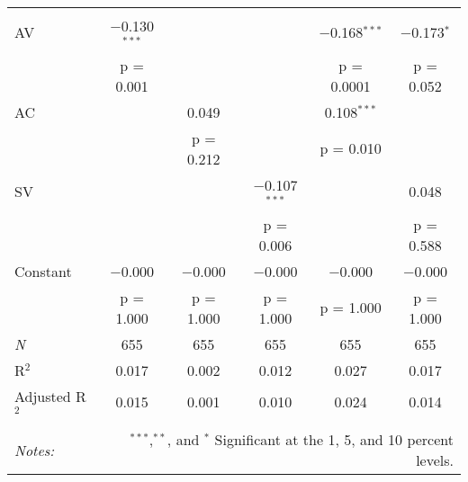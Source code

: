 
\begin{tabular}{@{\extracolsep{5pt}}lccccc} 
\\[-1.8ex]
\hline \\[-1.8ex] 
 AV & $-$0.130$^{***}$ &  &  & $-$0.168$^{***}$ & $-$0.173$^{*}$ \\ 
  & p = 0.001 &  &  & p = 0.0001 & p = 0.052 \\ 
 AC &  & 0.049 &  & 0.108$^{***}$ &  \\ 
  &  & p = 0.212 &  & p = 0.010 &  \\ 
 SV &  &  & $-$0.107$^{***}$ &  & 0.048 \\ 
  &  &  & p = 0.006 &  & p = 0.588 \\ 
 Constant & $-$0.000 & $-$0.000 & $-$0.000 & $-$0.000 & $-$0.000 \\ 
  & p = 1.000 & p = 1.000 & p = 1.000 & p = 1.000 & p = 1.000 \\ 
\textit{N} & 655 & 655 & 655 & 655 & 655 \\ 
R$^{2}$ & 0.017 & 0.002 & 0.012 & 0.027 & 0.017 \\ 
Adjusted R$^{2}$ & 0.015 & 0.001 & 0.010 & 0.024 & 0.014 \\ 
\hline \\[-1.8ex] 
\textit{Notes:} & \multicolumn{5}{r}{$^{***}$,$^{**}$, and $^{*}$ Significant at the 1, 5, and 10 percent levels.} \\ 
\end{tabular} 
